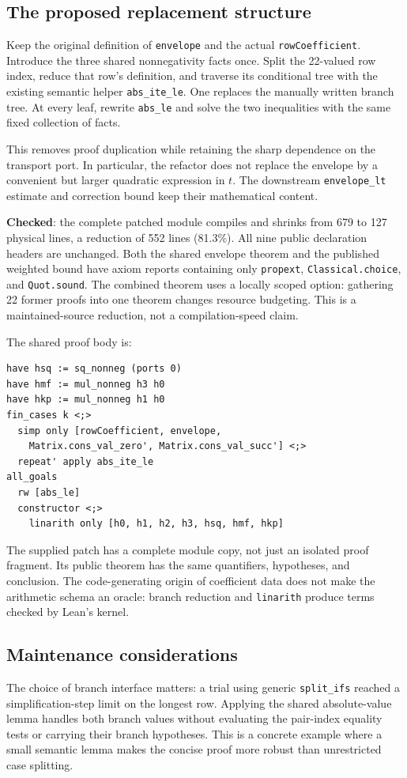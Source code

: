 \documentclass[11pt,letterpaper]{article}
\newcommand{\code}[1]{\nolinkurl{#1}}
\newcommand{\checked}{\textbf{Checked}}
\newcommand{\CoeffStatus}{\checked: the complete patched module compiles and shrinks from 679 to 127 physical lines, a reduction of 552 lines (81.3\%). All nine public declaration headers are unchanged. Both the shared envelope theorem and the published weighted bound have axiom reports containing only \code{propext}, \code{Classical.choice}, and \code{Quot.sound}. The combined theorem uses a locally scoped \texttt{\detokenize{maxHeartbeats 2000000}} option: gathering 22 former proofs into one theorem changes resource budgeting. This is a maintained-source reduction, not a compilation-speed claim.}
\begin{document}
\subsection{The proposed replacement structure}

Keep the original definition of \code{envelope} and the actual
\code{rowCoefficient}. Introduce the three shared nonnegativity facts once.
Split the 22-valued row index, reduce that row's definition, and traverse its
conditional tree with the existing semantic helper \code{abs_ite_le}.
One \texttt{} replaces the manually written branch tree.
At every leaf, rewrite \code{abs_le} and solve the two inequalities with the
same fixed collection of facts.

This removes proof duplication while retaining the sharp dependence on the
transport port. In particular, the refactor does not replace the envelope by a
convenient but larger quadratic expression in $t$. The downstream
\code{envelope_lt} estimate and correction bound keep their mathematical content.

\CoeffStatus

The shared proof body is:
\begin{lstlisting}
have hsq := sq_nonneg (ports 0)
have hmf := mul_nonneg h3 h0
have hkp := mul_nonneg h1 h0
fin_cases k <;>
  simp only [rowCoefficient, envelope,
    Matrix.cons_val_zero', Matrix.cons_val_succ'] <;>
  repeat' apply abs_ite_le
all_goals
  rw [abs_le]
  constructor <;>
    linarith only [h0, h1, h2, h3, hsq, hmf, hkp]
\end{lstlisting}

The supplied patch has a complete module copy, not just an isolated proof
fragment. Its public theorem has the same quantifiers, hypotheses, and conclusion.
The code-generating origin of coefficient data does not make the arithmetic
schema an oracle: branch reduction and \code{linarith} produce terms checked
by Lean's kernel.

\subsection{Maintenance considerations}

The choice of branch interface matters: a trial using generic
\code{split_ifs} reached a simplification-step limit on the longest row.
Applying the shared absolute-value lemma handles both branch values without
evaluating the pair-index equality tests or carrying their branch hypotheses.
This is a concrete example where a small semantic lemma makes the concise
proof more robust than unrestricted case splitting.
\end{document}
